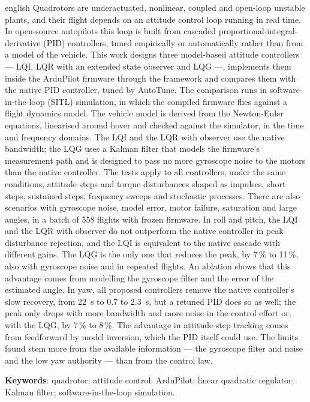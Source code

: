 \begin{resumo}[Abstract]
\begin{otherlanguage*}{english}
Quadrotors are underactuated, nonlinear, coupled and open-loop unstable
plants, and their flight depends on an attitude control loop running in real
time. In open-source autopilots this loop is built from cascaded
proportional-integral-derivative (PID) controllers, tuned empirically or
automatically rather than from a model of the vehicle. This work designs
three model-based attitude controllers --- LQI, LQR with an extended state
observer and LQG ---, implements them inside the ArduPilot firmware through
the  framework and compares them with the native
PID controller, tuned by AutoTune. The comparison runs in software-in-the-loop
(SITL) simulation, in which the compiled firmware flies against a flight
dynamics model. The vehicle model is derived from the Newton-Euler equations,
linearised around hover and checked against the simulator, in the time and
frequency domains. The LQI and the LQR with observer use the native
bandwidth; the LQG uses a Kalman filter that models the firmware's
measurement path and is designed to pass no more gyroscope noise to the
motors than the native controller. The tests apply to all controllers, under
the same conditions, attitude steps and torque disturbances shaped as
impulses, short steps, sustained steps, frequency sweeps and stochastic
processes. There are also scenarios with gyroscope noise, model error, motor
failure, saturation and large angles, in a batch of 558 flights with frozen
firmware. In roll and pitch, the LQI and the LQR with observer do not
outperform the native controller in peak disturbance rejection, and the LQI
is equivalent to the native cascade with different gains. The LQG is the
only one that reduces the peak, by 7\,\% to 11\,\%, also with gyroscope noise
and in repeated flights. An ablation shows that this advantage comes from
modelling the gyroscope filter and the error of the estimated angle. In yaw,
all proposed controllers remove the native controller's slow recovery, from
22~s to 0.7 to 2.3~s, but a retuned PID does so as well; the peak only drops
with more bandwidth and more noise in the control effort or, with the LQG,
by 7\,\% to 8\,\%. The advantage in attitude step tracking comes from
feedforward by model inversion, which the PID itself could use. The limits
found stem more from the available information --- the gyroscope filter and
noise and the low yaw authority --- than from the control law.

\vspace{\onelineskip}

\noindent
\textbf{Keywords}: quadrotor; attitude control; ArduPilot; linear quadratic
regulator; Kalman filter; software-in-the-loop simulation.
\end{otherlanguage*}
\end{resumo}
